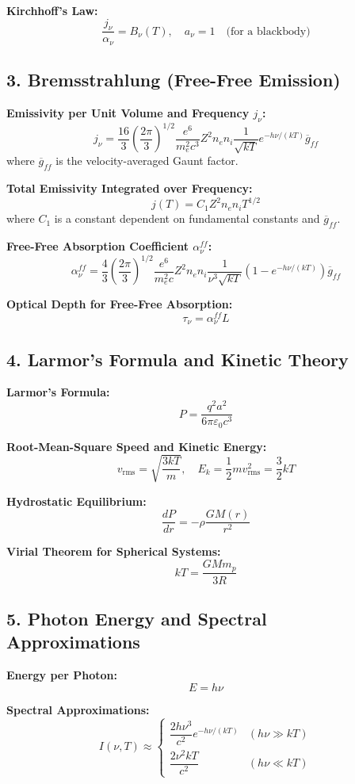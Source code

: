 \documentclass{article}
\begin{document}
\textbf{Kirchhoff's Law:}
\[
    \frac{j_\nu}{\alpha_\nu} = B_\nu(T), \quad a_\nu = 1 \quad \text{(for a blackbody)}
\]

\subsection*{3. Bremsstrahlung (Free-Free Emission)}

\textbf{Emissivity per Unit Volume and Frequency \( j_\nu \):}
\[
    j_\nu = \frac{16}{3} \left( \frac{2\pi}{3} \right)^{1/2} \frac{e^6}{m_e^2 c^3} Z^2 n_e n_i \frac{1}{\sqrt{k T}} e^{-h\nu/(kT)} \overline{g}_{ff}
\]
where \( \overline{g}_{ff} \) is the velocity-averaged Gaunt factor.

\textbf{Total Emissivity Integrated over Frequency:}
\[
    j(T) = C_1 Z^2 n_e n_i T^{1/2}
\]
where \( C_1 \) is a constant dependent on fundamental constants and \( \overline{g}_{ff} \).

\textbf{Free-Free Absorption Coefficient \( \alpha_\nu^{ff} \):}
\[
    \alpha_\nu^{ff} = \frac{4}{3} \left( \frac{2\pi}{3} \right)^{1/2} \frac{e^6}{m_e^2 c} Z^2 n_e n_i \frac{1}{\nu^3 \sqrt{k T}} \left(1 - e^{-h\nu/(kT)}\right) \overline{g}_{ff}
\]

\textbf{Optical Depth for Free-Free Absorption:}
\[
    \tau_\nu = \alpha_\nu^{ff} L
\]

\subsection*{4. Larmor's Formula and Kinetic Theory}

\textbf{Larmor's Formula:}
\[
    P = \frac{q^2 a^2}{6\pi \varepsilon_0 c^3}
\]

\textbf{Root-Mean-Square Speed and Kinetic Energy:}
\[
    v_{\text{rms}} = \sqrt{\frac{3 k T}{m}}, \quad E_k = \frac{1}{2} m v_{\text{rms}}^2 = \frac{3}{2} k T
\]

\textbf{Hydrostatic Equilibrium:}
\[
    \frac{dP}{dr} = -\rho \frac{G M(r)}{r^2}
\]

\textbf{Virial Theorem for Spherical Systems:}
\[
    k T = \frac{G M m_p}{3 R}
\]

\subsection*{5. Photon Energy and Spectral Approximations}

\textbf{Energy per Photon:}
\[
    E = h\nu
\]

\textbf{Spectral Approximations:}
\[
    I(\nu, T) \approx \begin{cases}
        \dfrac{2h\nu^3}{c^2} e^{-h\nu/(kT)} & (h\nu \gg kT) \\
        \dfrac{2\nu^2 k T}{c^2}             & (h\nu \ll kT)
    \end{cases}
\]
\end{document}
